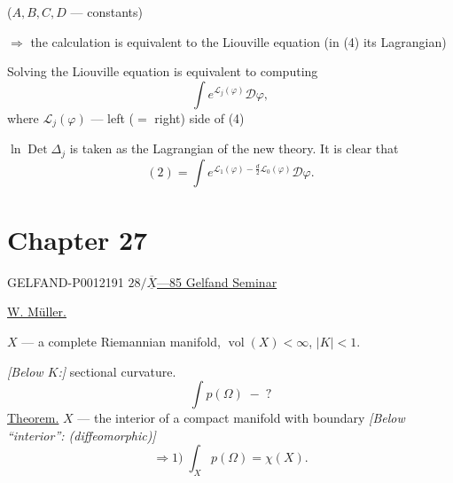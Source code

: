 (\(A,B,C,D\) --- constants)

\(\Rightarrow\) the calculation is equivalent to the Liouville equation (in (4) its Lagrangian)

Solving the Liouville equation is equivalent to computing
\begin{equation*}
\int e^{\mathcal L_j(\varphi)}\mathcal D\varphi,\tag{5}
\end{equation*}
where \(\mathcal L_j(\varphi)\) --- left (\(=\) right) side of (4)

\(\ln\operatorname{Det}\Delta_j\) is taken as the Lagrangian of the new theory. It is clear that
\begin{equation*}
(2)=\int e^{\mathcal L_1(\varphi)-\frac d2\mathcal L_0(\varphi)}\mathcal D\varphi.\tag{6}
\end{equation*}


\clearpage
{}
\section*{Chapter 27}
\begin{GelfandAdjacentEvidence}{GELFAND-P001219}{1}
\underline{\(28/\overline{\underline{X}}\)---85 }\qquad \underline{Gelfand Seminar}

\underline{W. Müller.}


\(X\) --- a complete Riemannian manifold, \(\operatorname{vol}(X)<\infty\), \(\lvert K\rvert<1\).

\textit{[Below \(K\):]} sectional curvature.
\[
\int p(\Omega)\;-\;?
\]
\underline{Theorem.} \(X\) --- the interior of a compact manifold with boundary
\textit{[Below “interior”: (diffeomorphic)]}
\[
\Rightarrow 1)\;\int_X p(\Omega)=\chi(X).
\]
\end{GelfandAdjacentEvidence}



